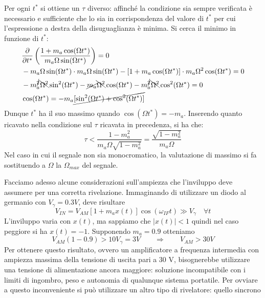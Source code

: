 Per ogni $t^*$ si ottiene un $\tau$ diverso: affinché la condizione sia sempre verificata è necessario e sufficiente che lo sia in corrispondenza del valore di $t^*$ per cui l'espressione a destra della disuguaglianza è minima. Si cerca il minimo in funzione di $t^*$:
\begin{align*}
&
\frac{\partial}{\partial t^*}
\left(
\frac{1+m_a\cos(\Omega t^*)}{m_a\Omega\sin(\Omega t^*)}
\right) = 0
\\&
-m_a\Omega\sin(\Omega t^*) \cdot m_a\Omega\sin(\Omega t^*)
-[1+m_a\cos(\Omega t^*)]\cdot m_a \Omega^2\cos(\Omega t^*)
=0
\\&
-m_a^{\cancel{2}}\bcancel{\Omega^2} \sin^2(\Omega t^*)
- \cancel{m_a} \bcancel{\Omega^2}\cos(\Omega t^*)
- m_a^{\cancel{2}} \bcancel{\Omega^2}\cos^2(\Omega t^*) = 0
\\&
\cos(\Omega t^*) = -m_a \cancel{[\sin^2(\Omega t^*)+\cos^2(\Omega t^*)]}
\end{align*}
Dunque $t^*$ ha il suo massimo quando $\cos(\Omega t^*) = -m_a$. Inserendo quanto ricavato nella condizione sul $\tau$ ricavata in precedenza, si ha che:
\[
\tau < \frac{1-m_a^2}{m_a\Omega\sqrt{1-m_a^2}} = 
\frac{\sqrt{1-m_a^2}}{m_a\Omega}
\]
Nel caso in cui il segnale non sia monocromatico, la valutazione di massimo si fa sostituendo a $\Omega$ la $\Omega_{max}$ del segnale.

Facciamo adesso alcune considerazioni sull'ampiezza che l'inviluppo deve assumere per una corretta rivelazione. Immaginando di utilizzare un diodo al germanio con $V_\gamma = 0.3 V$, deve risultare
\[
V_{IN} = V_{AM}[1+m_ax(t)]\cos(\omega_{IF}t) \gg V_\gamma
\quad \forall t
\]
L'inviluppo varia con $x(t)$, ma sappiamo che $|x(t)| < 1$ quindi nel caso peggiore si ha $x(t) = -1$.
Supponendo $m_a = 0.9$ otteniamo
\[
V_{AM}(1-0.9) > 10V_\gamma = 3V
\qquad\Rightarrow\qquad
V_{AM} > 30V
\]
Per ottenere questo risultato, ovvero un amplificatore a frequenza intermedia con ampiezza
massima della tensione di uscita pari a 30 V, bisognerebbe utilizzare una tensione di alimentazione
ancora maggiore: soluzione incompatibile con i limiti di ingombro, peso e autonomia di qualunque
sistema portatile. Per ovviare a questo inconveniente si può utilizzare un altro tipo di rivelatore:
quello sincrono

